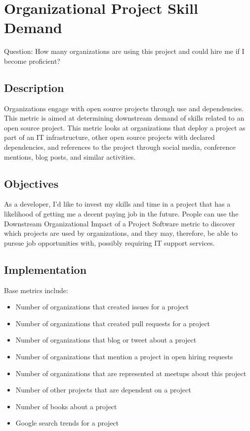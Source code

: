 \hypertarget{organizational-project-skill-demand}{%
\section{Organizational Project Skill
Demand}\label{organizational-project-skill-demand}}

Question: How many organizations are using this project and could hire
me if I become proficient?

\hypertarget{description}{%
\subsection{Description}\label{description}}

Organizations engage with open source projects through use and
dependencies. This metric is aimed at determining downstream demand of
skills related to an open source project. This metric looks at
organizations that deploy a project as part of an IT infrastructure,
other open source projects with declared dependencies, and references to
the project through social media, conference mentions, blog posts, and
similar activities.

\hypertarget{objectives}{%
\subsection{Objectives}\label{objectives}}

As a developer, I'd like to invest my skills and time in a project that
has a likelihood of getting me a decent paying job in the future. People
can use the Downstream Organizational Impact of a Project Software
metric to discover which projects are used by organizations, and they
may, therefore, be able to pursue job opportunities with, possibly
requiring IT support services.

\hypertarget{implementation}{%
\subsection{Implementation}\label{implementation}}

Base metrics include:

\begin{itemize}
\tightlist
\item
  Number of organizations that created issues for a project
\item
  Number of organizations that created pull requests for a project
\item
  Number of organizations that blog or tweet about a project
\item
  Number of organizations that mention a project in open hiring requests
\item
  Number of organizations that are represented at meetups about this
  project
\item
  Number of other projects that are dependent on a project
\item
  Number of books about a project
\item
  Google search trends for a project
\end{itemize}

